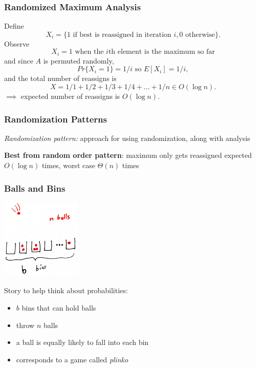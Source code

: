 \documentclass[10pt]{beamer}
\begin{document}
\begin{frame} \frametitle{Randomized Maximum Analysis}
Define
\[ X_i = \{\text{1 if best is reassigned in iteration } i, 0 \text{ otherwise} \} .\]
Observe
\[ X_i = 1 \text{ when the } i\text{th element is the maximum so far} \]
and since $A$ is permuted randomly,
\[ Pr\{X_i=1\} = 1/i \text{ so } E[X_i] = 1/i, \]
and the total number of reassigns is
\[ X = 1/1 + 1/2 + 1/3 + 1/4 + \ldots + 1/n \in O(\log n). \]
$\implies$ expected number of reassigns is $O(\log n).$
\end{frame}


\begin{frame} \frametitle{Randomization Patterns}
\emph{Randomization pattern:} approach for using randomization, along with
analysis
\vspace{1cm}

\textbf{Best from random order pattern}: maximum only gets reassigned expected $O(\log n)$ times,
worst case $\Theta(n)$ times

\end{frame}

\begin{frame} \frametitle{Balls and Bins}
  \begin{center}
    \includegraphics[height=1.5in]{balls-bins.jpg}
  \end{center}

Story to help think about probabilities:
\begin{itemize}
  \item $b$ bins that can hold balls
  \item throw $n$ balls
  \item a ball is equally likely to fall into each bin
  \item corresponds to a game called \emph{plinko}
\end{itemize}
\end{frame}
\end{document}
